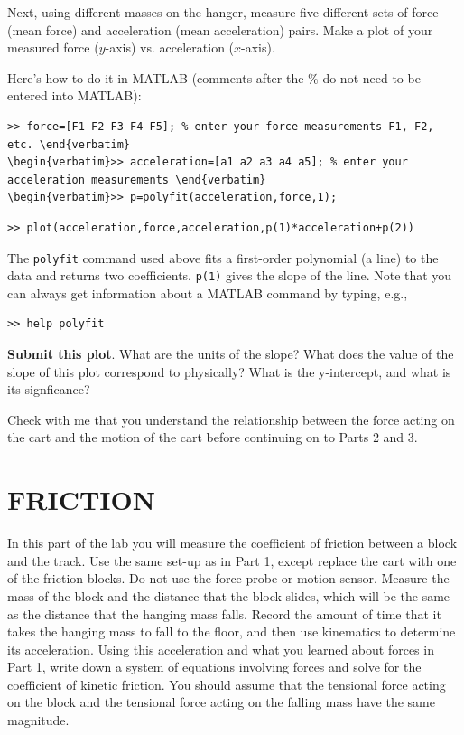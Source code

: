 \documentclass[11pt,letterpaper]{article}
\begin{document}
Next, using different masses on the hanger, measure five different sets of force (mean force) and acceleration (mean acceleration) pairs. Make a plot of your measured force ($y$-axis) vs. acceleration ($x$-axis). 

Here's how to do it in MATLAB (comments after the \% do not need to be entered into MATLAB):
\begin{verbatim}>> force=[F1 F2 F3 F4 F5]; % enter your force measurements F1, F2, etc. \end{verbatim}
\begin{verbatim}>> acceleration=[a1 a2 a3 a4 a5]; % enter your acceleration measurements \end{verbatim}
\begin{verbatim}>> p=polyfit(acceleration,force,1); \end{verbatim}
\begin{verbatim}>> plot(acceleration,force,acceleration,p(1)*acceleration+p(2)) \end{verbatim}

The \verb+polyfit+ command used above fits a first-order polynomial (a line) to the data and returns two coefficients. \verb+p(1)+ gives the slope of the line. Note that you can always get information about a MATLAB command by typing, e.g., 
\begin{verbatim}>> help polyfit\end{verbatim}

 \textbf{Submit this plot}.  What are the units of the slope?  What does the value of the slope of this plot correspond to physically? What is the y-intercept, and what is its signficance?

Check with me that you understand the relationship between the force acting on the cart and the motion of the cart before continuing on to Parts 2 and 3.

\section{FRICTION}
In this part of the lab you will measure the coefficient of friction between a block and the track. Use the same set-up as in Part 1, except replace the cart with one of the friction blocks. Do not use the force probe or motion sensor. Measure the mass of the block and the distance that the block slides, which will be the same as the distance that the hanging mass falls. Record the amount of time that it takes the hanging mass to fall to the floor, and then use kinematics to determine its acceleration. Using this acceleration and what you learned about forces in Part 1, write down a system of equations involving forces and solve for the coefficient of kinetic friction. You should assume that the tensional force acting on the block and the tensional force acting on the falling mass have the same magnitude.
\end{document}
